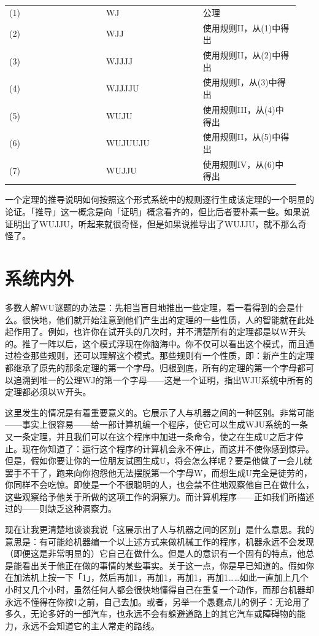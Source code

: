 \documentclass[
  12pt,
  twoside,
  openright,
  oldfontcommands,
]{memoir}
\begin{document}
\begin{longtable}[]{>{\raggedright\arraybackslash}p{0.313\linewidth} >{\raggedright\arraybackslash}p{0.313\linewidth} >{\raggedright\arraybackslash}p{0.313\linewidth}}
\toprule\noalign{}
\endhead
\bottomrule\noalign{}
\endlastfoot
(1) & WJ & 公理 \\
(2) & WJJ & 使用规则II，从(1)中得出 \\
(3) & WJJJJ & 使用规则II，从(2)中得出 \\
(4) & WJJJJU & 使用规则I，从(3)中得出 \\
(5) & WUJU & 使用规则III，从(4)中得出 \\
(6) & WUJUUJU & 使用规则II，从(5)中得出 \\
(7) & WUJJU & 使用规则IV，从(6)中得出 \\
\end{longtable}

一个定理的推导说明如何按照这个形式系统中的规则逐行生成该定理的一个明显的论证。「推导」这一概念是向「证明」概念看齐的，但比后者要朴素一些。如果说证明出了WUJJU，听起来就很奇怪，但是如果说推导出了WUJJU，就不那么奇怪了。

\section{系统内外}

多数人解WU谜题的办法是：先相当盲目地推出一些定理，看一看得到的会是什么。很快地，他们就开始注意到他们产生出的定理的一些性质，人的智能就在此处起作用了。例如，也许你在试开头的几次时，并不清楚所有的定理都是以W开头的。推了一阵以后，这个模式浮现在你脑海中。你不仅可以看出这个模式，而且通过检查那些规则，还可以理解这个模式。那些规则有一个性质，即：新产生的定理都继承了原先的那条定理的第一个字母。归根到底，所有的定理的第一个字母都可以追溯到唯一的公理WJ的第一个字母------这是一个证明，指出WJU系统中所有的定理都必须以W开头。

这里发生的情况是有着重要意义的。它展示了人与机器之间的一种区别。非常可能------事实上很容易------给一部计算机编一个程序，使它可以生成WJU系统的一条又一条定理，并且我们可以在这个程序中加进一条命令，使之在生成U之后才停止。现在你知道了：运行这个程序的计算机会永不停止，而这并不使你感到惊异。但是，假如你要让你的一位朋友试图生成U，将会怎么样呢？要是他做了一会儿就罢手不干了，跑来向你抱怨他无法摆脱第一个字母W，而想生成U完全是徒劳的，你同样不会吃惊。即使是一个不很聪明的人，也会禁不住地观察他自己在做什么，这些观察给予他关于所做的这项工作的洞察力。而计算机程序------正如我们所描述过的------则缺乏这种洞察力。

现在让我更清楚地谈谈我说「这展示出了人与机器之间的区别」是什么意思。我的意思是：有可能给机器编一个以上述方式来做机械工作的程序，机器永远不会发现（即便这是非常明显的）它自己在做什么。但是人的意识有一个固有的特点，他总是能看出关于他正在做的事情的某些事实。关于这一点，你是早已知道的。假如你在加法机上按一下「1」，然后再加1，再加1，再加1，再加1\ldots\ldots 如此一直加上几个小时又几个小时，虽然任何人都会很快地懂得自己在重复一个动作，而那台机器却永远不懂得在你按1之前，自己去加。或者，另举一个愚蠢点儿的例子：无论用了多久，无论多好的一部汽车，也永远不会有躲避道路上的其它汽车或障碍物的能力，永远不会知道它的主人常走的路线。
\end{document}
